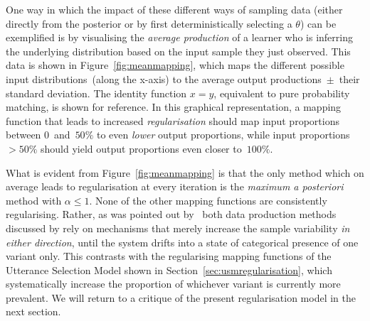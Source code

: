 One way in which the impact of these different ways of sampling data (either directly from the posterior or by first deterministically selecting a $\theta$) can be exemplified is by visualising the \emph{average production} of a learner who is inferring the underlying distribution based on the input sample they just observed. This data is shown in Figure~\ref{fig:meanmapping}, which maps the different possible input distributions~(along the x-axis) to the average output productions~$\pm$~their standard deviation. The identity function $x=y$, equivalent to pure probability matching, is shown for reference. In this graphical representation, a mapping function that leads to increased \emph{regularisation} should map input proportions between $0$~and~$50\%$ to even \emph{lower} output proportions, while input proportions~$>50\%$ should yield output proportions even closer to~$100\%$.

What is evident from Figure~\ref{fig:meanmapping} is that the only method which on average leads to regularisation at every iteration is the \emph{maximum a posteriori} method with $\alpha\le 1$. None of the other mapping functions are consistently regularising. Rather, as was pointed out by~\citet[p.176]{Ferdinand2015} both data production methods discussed by \citeauthor{Reali2009} rely on mechanisms that merely increase the sample variability \emph{in either direction}, until the system drifts into a state of categorical presence of one variant only. This contrasts with the regularising mapping functions of the Utterance Selection Model shown in Section~\ref{sec:usmregularisation}, which systematically increase the proportion of whichever variant is currently more prevalent. We will return to a critique of the present regularisation model in the next section. %

